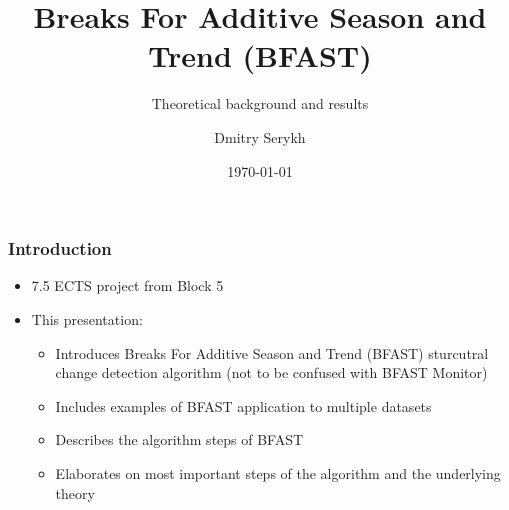 \documentclass[9pt]{beamer}
\title{Breaks For Additive Season and Trend (BFAST)}
\subtitle{Theoretical background and results}
\institute{Department of Computer Science}
\author{Dmitry Serykh}
\date{\today}
\begin{document}
\frame[plain]{\titlepage}



\begin{frame}
\frametitle{Introduction}
\begin{itemize}
\item 7.5 ECTS project from Block 5
\item This presentation:
\begin{itemize}
  \item Introduces Breaks For Additive Season and Trend (BFAST) sturcutral change
    detection algorithm (not to be confused with BFAST Monitor)
  \item Includes examples of BFAST application to multiple datasets
  \item Describes the algorithm steps of BFAST
  \item Elaborates on most important steps of the algorithm and the underlying theory
\end{itemize}
\end{itemize}
\end{frame}






\end{document}
